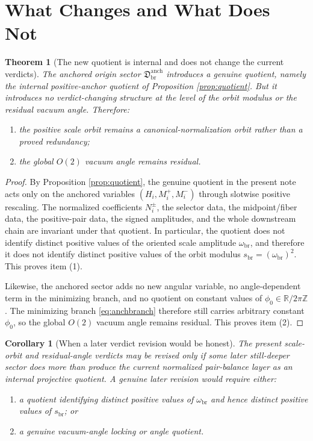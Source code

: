\documentclass[11pt]{article}
\newcommand{\ScaleMod}{s_{\mathrm{br}}}
\newcommand{\AbsScaleAmp}{\omega_{\mathrm{br}}}
\newcommand{\BalOriginSector}{\mathfrak D_{\mathrm{br}}^{\mathrm{anch}}}
\newtheorem{corollary}{Corollary}
\newtheorem{theorem}{Theorem}
\begin{document}
\section{What Changes and What Does Not}

\begin{theorem}[The new quotient is internal and does not change the current verdicts]
\label{thm:anchverdict}
The anchored origin sector \(\BalOriginSector\) introduces a genuine quotient, namely the internal positive-anchor quotient of Proposition \ref{prop:quotient}. But it introduces no verdict-changing structure at the level of the orbit modulus or the residual vacuum angle. Therefore:
\begin{enumerate}
    \item the positive scale orbit remains a canonical-normalization orbit rather than a proved redundancy;
    \item the global \(O(2)\) vacuum angle remains residual.
\end{enumerate}
\end{theorem}

\begin{proof}
By Proposition \ref{prop:quotient}, the genuine quotient in the present note acts only on the anchored variables \((H_i,M_i^+,M_i^-)\) through slotwise positive rescaling. The normalized coefficients \(N_i^\pm\), the selector data, the midpoint/fiber data, the positive-pair data, the signed amplitudes, and the whole downstream chain are invariant under that quotient. In particular, the quotient does not identify distinct positive values of the oriented scale amplitude \(\AbsScaleAmp\), and therefore it does not identify distinct positive values of the orbit modulus \(\ScaleMod=(\AbsScaleAmp)^{2}\). This proves item (1).

Likewise, the anchored sector adds no new angular variable, no angle-dependent term in the minimizing branch, and no quotient on constant values of \(\phi_{0}\in\mathbb R/2\pi\mathbb Z\). The minimizing branch \eqref{eq:anchbranch} therefore still carries arbitrary constant \(\phi_{0}\), so the global \(O(2)\) vacuum angle remains residual. This proves item (2).
\end{proof}

\begin{corollary}[When a later verdict revision would be honest]
\label{cor:anchrevision}
The present scale-orbit and residual-angle verdicts may be revised only if some later still-deeper sector does more than produce the current normalized pair-balance layer as an internal projective quotient. A genuine later revision would require either:
\begin{enumerate}
    \item a quotient identifying distinct positive values of \(\AbsScaleAmp\) and hence distinct positive values of \(\ScaleMod\); or
    \item a genuine vacuum-angle locking or angle quotient.
\end{enumerate}
\end{corollary}
\end{document}
